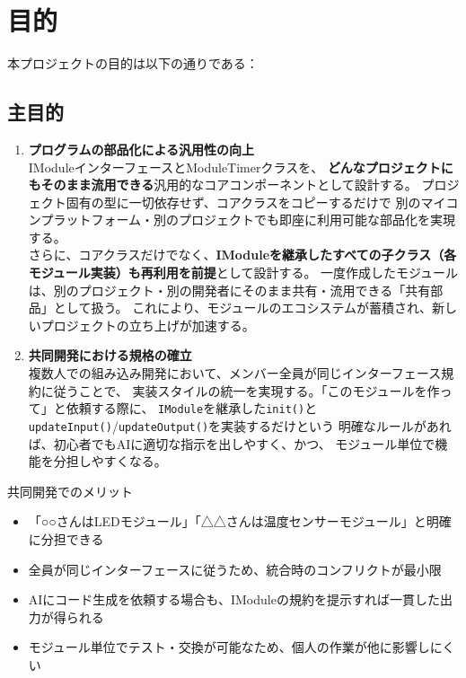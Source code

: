\section{目的}

本プロジェクトの目的は以下の通りである：

\subsection{主目的}

\begin{enumerate}
    \item \textbf{プログラムの部品化による汎用性の向上} \\
    IModuleインターフェースとModuleTimerクラスを、
    \textbf{どんなプロジェクトにもそのまま流用できる}汎用的なコアコンポーネントとして設計する。
    プロジェクト固有の型に一切依存せず、コアクラスをコピーするだけで
    別のマイコンプラットフォーム・別のプロジェクトでも即座に利用可能な部品化を実現する。\\[6pt]
    さらに、コアクラスだけでなく、\textbf{IModuleを継承したすべての子クラス（各モジュール実装）も再利用を前提}として設計する。
    一度作成したモジュールは、別のプロジェクト・別の開発者にそのまま共有・流用できる「共有部品」として扱う。
    これにより、モジュールのエコシステムが蓄積され、新しいプロジェクトの立ち上げが加速する。

    \item \textbf{共同開発における規格の確立} \\
    複数人での組み込み開発において、メンバー全員が同じインターフェース規約に従うことで、
    実装スタイルの統一を実現する。「このモジュールを作って」と依頼する際に、
    \texttt{IModule}を継承した\texttt{init()}と\texttt{updateInput()}/\texttt{updateOutput()}を実装するだけという
    明確なルールがあれば、初心者でもAIに適切な指示を出しやすく、かつ、
    モジュール単位で機能を分担しやすくなる。
\end{enumerate}

\begin{funcblock}{共同開発でのメリット}
\begin{itemize}
    \item 「○○さんはLEDモジュール」「△△さんは温度センサーモジュール」と明確に分担できる
    \item 全員が同じインターフェースに従うため、統合時のコンフリクトが最小限
    \item AIにコード生成を依頼する場合も、IModuleの規約を提示すれば一貫した出力が得られる
    \item モジュール単位でテスト・交換が可能なため、個人の作業が他に影響しにくい
\end{itemize}
\end{funcblock}


